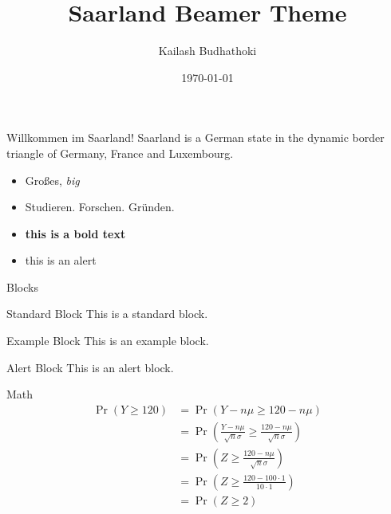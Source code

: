 \documentclass[11pt]{beamer}
\author{Kailash Budhathoki}
\title{Saarland Beamer Theme}
\institute{Max Planck Institute for Informatics and Saarland University}
\date{\today}
\begin{document}
	\begin{frame}
		\titlepage
	\end{frame}
	
	\begin{frame}{Willkommen im Saarland!}
	Saarland is a German state in the dynamic border triangle of Germany, France and Luxembourg. 
		\begin{itemize}
			\item Gro{\ss}es, \textit{big}
			\item Studieren. Forschen. Gr{\"u}nden.	
			\item \textbf{this is a bold text}
			\item \alert{this is an alert}
		\end{itemize}
	\end{frame}

	\begin{frame}{Blocks}
		\begin{block}{Standard Block}
			This is a standard block.
		\end{block}
		
		\begin{exampleblock}{Example Block}
			This is an example block.
		\end{exampleblock}
		
		\begin{alertblock}{Alert Block}
			This is an alert block.
		\end{alertblock}
	\end{frame}
	
	\begin{frame}{Math}
		\begin{align*}
			\Pr(Y \geq 120) &= \Pr\left(Y-n\mu \geq 120-n\mu \right)\\
			&= \Pr\left( \frac{Y-n\mu }{\sqrt{n}\sigma} \geq \frac{120-n\mu }{\sqrt{n}\sigma} \right)\\
			&=\Pr\left( Z \geq \frac{120-n\mu }{\sqrt{n}\sigma} \right)\\
			&=\Pr\left( Z \geq \frac{120-100 \cdot 1 }{10 \cdot 1} \right)\\
			&=\Pr\left( Z \geq 2\right)
		\end{align*}
	\end{frame}
\end{document}
